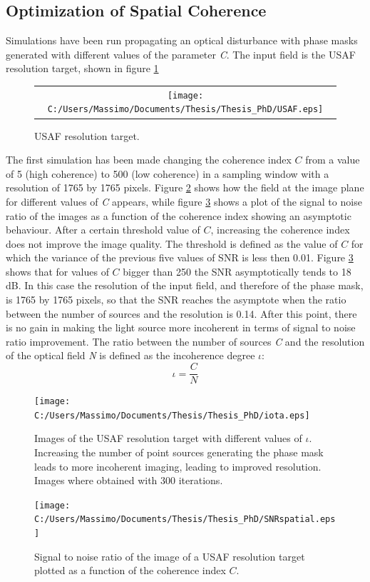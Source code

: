  \subsection{Optimization of Spatial Coherence}
 Simulations have been run propagating an optical disturbance with phase masks generated with different values of the parameter \textit{C}.
 The input field is the USAF resolution target, shown in figure \ref{fig:USAF}
 \begin{figure}[H]
 	\begin{center}
 		\begin{tabular}{c}
 			\texttt{[image: C:/Users/Massimo/Documents/Thesis/Thesis\_PhD/USAF.eps]}
 		\end{tabular}
 	\end{center}
 	\caption{ \label{fig:USAF} 
 		USAF resolution target. }
 \end{figure} 
 The first simulation has been made changing the coherence index $C$ from a value of 5 (high coherence) to 500 (low coherence) in a sampling window with a resolution of 1765 by 1765 pixels.
 Figure \ref{fig:spatialsnr2} shows how the field at the image plane for different values of \textit{C} appears, while figure \ref{fig:spatialsnr1} shows a plot of the signal to noise ratio of the images as a function of the coherence index showing an asymptotic behaviour. After a certain threshold value of $C$, increasing the coherence index does not improve the image quality. The threshold is defined as the value of $C$ for which the variance of the previous five values of SNR is less then 0.01.
Figure \ref{fig:spatialsnr1} shows that for values of $C$ bigger than 250 the SNR asymptotically tends to 18 dB. In this case the resolution of the input field, and therefore of the phase mask, is 1765 by 1765 pixels, so that the SNR reaches the asymptote when the ratio between the number of sources and the resolution is 0.14. After this point, there is no gain in making the light source more incoherent in terms of signal to noise ratio improvement.
The ratio between the number of sources \textit{C} and the resolution of the optical field \textit{N} is defined as the incoherence degree $\iota$:
\begin{equation}
\label{eq:incoherence_degree}
\iota = \dfrac{C}{N}
\end{equation}
\begin{figure}[H]
 	\centering
 	\texttt{[image: C:/Users/Massimo/Documents/Thesis/Thesis\_PhD/iota.eps]}
 	\caption{\label{fig:spatialsnr2}Images of the USAF resolution target with different values of $\iota$. Increasing the number of point sources generating the phase mask leads to more incoherent imaging, leading to improved resolution. Images where obtained with 300 iterations.}
 \end{figure}
 \begin{figure}[H]
 	\centering
 	\texttt{[image: C:/Users/Massimo/Documents/Thesis/Thesis\_PhD/SNRspatial.eps]}
 	\caption{\label{fig:spatialsnr1}Signal to noise ratio of the image of a USAF resolution target plotted as a function of the coherence index $C$.}
 \end{figure}
 \newpage
